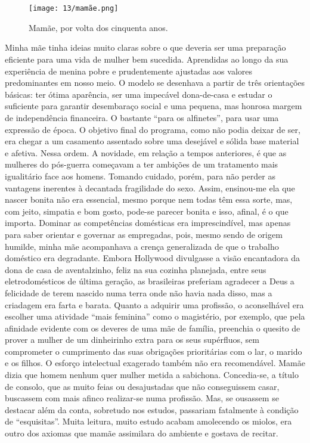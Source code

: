 \chapter{}

\begin{figure}
\centering
\texttt{[image: 13/mamãe.png]}
\caption{Mamãe, por volta dos cinquenta anos.}
\end{figure}

Minha mãe tinha ideias muito claras sobre o que deveria ser uma preparação eficiente para uma vida de mulher bem sucedida.
Aprendidas ao longo da sua experiência de menina pobre e prudentemente ajustadas aos valores predominantes em nosso meio.
O modelo se desenhava a partir de três orientações básicas: ter ótima aparência, ser uma impecável dona-de-casa e estudar o suficiente para garantir desembaraço social e uma pequena, mas honrosa margem de independência financeira.
O bastante ``para os alfinetes'', para usar uma expressão de época.
O objetivo final do programa, como não podia deixar de ser, era chegar a um casamento assentado sobre uma desejável e sólida base material e afetiva.
Nessa ordem.
A novidade, em relação a tempos anteriores, é que as mulheres do pós-guerra começavam a ter ambições de um tratamento mais igualitário face aos homens.
Tomando cuidado, porém, para não perder as vantagens inerentes à decantada fragilidade do sexo.
Assim, ensinou-me ela que nascer bonita não era essencial, mesmo porque nem todas têm essa sorte, mas, com jeito, simpatia e bom gosto, pode-se parecer bonita e isso, afinal, é o que importa.
Dominar as competências domésticas era imprescindível, mas apenas para saber orientar e governar as empregadas, pois, mesmo sendo de origem humilde, minha mãe acompanhava a crença generalizada de que o trabalho doméstico era degradante.
Embora Hollywood divulgasse a visão encantadora da dona de casa de aventalzinho, feliz na sua cozinha planejada, entre seus eletrodomésticos de última geração, as brasileiras preferiam agradecer a Deus a felicidade de terem nascido numa terra onde não havia nada disso, mas a criadagem era farta e barata.
Quanto a adquirir uma profissão, o aconselhável era escolher uma atividade ``mais feminina'' como o magistério, por exemplo, que pela afinidade evidente com os deveres de uma mãe de família, preenchia o quesito de prover a mulher de um dinheirinho extra para os seus supérfluos, sem comprometer o cumprimento das suas obrigações prioritárias com o lar, o marido e os filhos.
O esforço intelectual exagerado também não era recomendável.
Mamãe dizia que homem nenhum quer mulher metida a sabichona.
Concedia-se, a título de consolo, que as muito feias ou desajustadas que não conseguissem casar, buscassem com mais afinco realizar-se numa profissão.
Mas, se ousassem se destacar além da conta, sobretudo nos estudos, passariam fatalmente à condição de ``esquisitas''.
Muita leitura, muito estudo acabam amolecendo os miolos, era outro dos axiomas que mamãe assimilara do ambiente e gostava de recitar.

